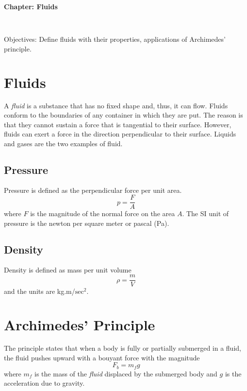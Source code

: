 \documentclass[10pt]{article}
\date{2014-6-22}
\begin{document}
\begin{center}
\begin{Large}\textbf{Chapter: Fluids}\end{Large} \\
\smallskip
\end{center}
Objectives: Define fluids with their properties, applications of Archimedes' principle.
\section{Fluids}
A \emph{fluid} is a substance that has no fixed shape and, thus, it can flow.  Fluids conform to the boundaries of any container in which they are put.  The reason is that they cannot sustain a force that is tangential to their surface.  However, fluids can exert a force in the direction perpendicular to their surface.  Liquids and gases are the two examples of fluid.
\subsection{Pressure}
Pressure is defined as the perpendicular force per unit area.  
\begin{equation}
  p=\frac{F}{A}
\end{equation}
where $F$ is the magnitude of the normal force on the area $A$.  The SI unit of pressure is the newton per square meter or pascal (Pa).
\subsection{Density}
Density is defined as mass per unit volume
\begin{equation}
  \rho = \frac{m}{V}
\end{equation}
and the units are kg.m/$\text{sec}^2$.  

\section{Archimedes' Principle}
The principle states that when a body is fully or partially submerged in a fluid, the fluid pushes upward with a bouyant force with the magnitude
\begin{equation}
\label{bouyequation}
  F_b=m_fg
\end{equation}
where $m_f$ is the mass of the \emph{fluid} displaced by the submerged body and $g$ is the acceleration due to gravity.
\end{document}
